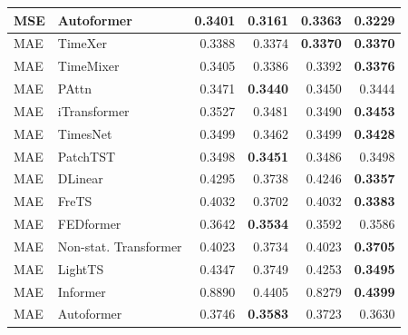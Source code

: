 \begin{longtable}{llrrrr}
MSE & Autoformer & 0.3401 & \textbf{0.3161} & 0.3363 & 0.3229 \\
\midrule
MAE & TimeXer & 0.3388 & 0.3374 & \textbf{0.3370} & \textbf{0.3370} \\
MAE & TimeMixer & 0.3405 & 0.3386 & 0.3392 & \textbf{0.3376} \\
MAE & PAttn & 0.3471 & \textbf{0.3440} & 0.3450 & 0.3444 \\
MAE & iTransformer & 0.3527 & 0.3481 & 0.3490 & \textbf{0.3453} \\
MAE & TimesNet & 0.3499 & 0.3462 & 0.3499 & \textbf{0.3428} \\
MAE & PatchTST & 0.3498 & \textbf{0.3451} & 0.3486 & 0.3498 \\
MAE & DLinear & 0.4295 & 0.3738 & 0.4246 & \textbf{0.3357} \\
MAE & FreTS & 0.4032 & 0.3702 & 0.4032 & \textbf{0.3383} \\
MAE & FEDformer & 0.3642 & \textbf{0.3534} & 0.3592 & 0.3586 \\
MAE & Non-stat. Transformer & 0.4023 & 0.3734 & 0.4023 & \textbf{0.3705} \\
MAE & LightTS & 0.4347 & 0.3749 & 0.4253 & \textbf{0.3495} \\
MAE & Informer & 0.8890 & 0.4405 & 0.8279 & \textbf{0.4399} \\
MAE & Autoformer & 0.3746 & \textbf{0.3583} & 0.3723 & 0.3630 \\
\end{longtable}
\endgroup

